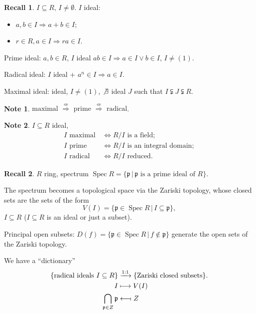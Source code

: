 \documentclass[12pt]{article}
\DeclareMathOperator{\Spec}{Spec}
\theoremstyle{definition}
\newtheorem*{note}{Note}
\newtheorem*{recall}{Recall}
\begin{document}
\begin{recall}
$I\subseteq R$, $I\neq\emptyset$. $I$ ideal:
\begin{itemize}
\item $a,b\in I\Rightarrow a+b\in I$;
\item $r\in R,a\in I\Rightarrow ra\in I$.
\end{itemize}

Prime ideal: $a,b\in R$, $I$ ideal $ab\in I\Rightarrow a\in I\vee b\in I$, $I\neq(1)$.

Radical ideal: $I$ ideal + $a^n\in I\Rightarrow a\in I$.

Maximal ideal: ideal, $I\neq(1)$, $\not\exists$ ideal $J$ such that $I\subsetneqq J\subsetneqq R$.
\end{recall}

\begin{note}
$\text{maximal }\overset{\not\Leftarrow}\Rightarrow\text{ prime }\overset{\not\Leftarrow}\Rightarrow\text{ radical}$.
\end{note}

\begin{note}
$I\subseteq R$ ideal,
\begin{align*}
I\text{ maximal}\,&\Longleftrightarrow R/I\text{ is a field};\\I\text{ prime}\,&\Longleftrightarrow R/I\text{ is an integral domain};\\I\text{ radical}\,&\Longleftrightarrow R/I\text{ reduced}.
\end{align*}
\end{note}

\begin{recall}
$R$ ring, spectrum $\Spec R=\{\mathfrak p\,|\,\mathfrak p\text{ is a prime ideal of }R\}$.
\end{recall}

The spectrum becomes a topological space via the Zariski topology, whose closed sets are the sets of the form
\[V(I)=\{\mathfrak p\in\Spec R\,|\,I\subseteq\mathfrak p\},\]
$I\subseteq R$ ($I\subseteq R$ is an ideal or just a subset).

Principal open subsets: $D(f)=\{\mathfrak p\in\Spec R\,|\,f\notin\mathfrak p\}$ generate the open sets of the Zariski topology.

We have a ``dictionary''
\begin{align*}
\{\text{radical ideals }I\subseteq R\}&\xrightarrow{1:1}\{\text{Zariski closed subsets}\}.\\I&\longmapsto V(I)\\\bigcap_{\mathfrak p\in Z}\mathfrak p&\longleftarrow\!\shortmid Z
\end{align*}
\end{document}
